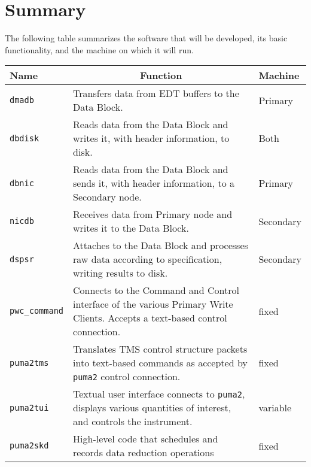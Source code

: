 \chapter{Summary}

The following table summarizes the software that will be developed,
its basic functionality, and the machine on which it will run.

\vspace{5mm}

\begin{tabular}{l|p{8cm}|l}

Name & \multicolumn{1}{c}{Function} & Machine \\ \hline

{\tt dmadb} & Transfers data from EDT buffers to the Data Block.
	& Primary \\

{\tt dbdisk} & Reads data from the Data Block and writes it, with
	header information, to disk. & Both \\

{\tt dbnic} & Reads data from the Data Block and sends it, with
	header information, to a Secondary node. & Primary \\

{\tt nicdb} & Receives data from Primary node and writes it to the 
	Data Block. & Secondary \\

{\tt dspsr} & Attaches to the Data Block and processes raw data
	according to specification, writing results to disk. &
	Secondary \\

{\tt pwc_command} & Connects to the Command and Control interface of
	the various Primary Write Clients.  Accepts a text-based
	control connection.  & fixed \\

{\tt puma2tms} & Translates TMS control structure packets into
	text-based commands as accepted by {\tt puma2} control
	connection. & fixed \\

{\tt puma2tui} & Textual user interface connects to {\tt puma2},
	displays various quantities of interest, and controls
	the instrument. & variable \\

{\tt puma2skd} & High-level code that schedules and records
        data reduction operations & fixed \\

\end{tabular}

